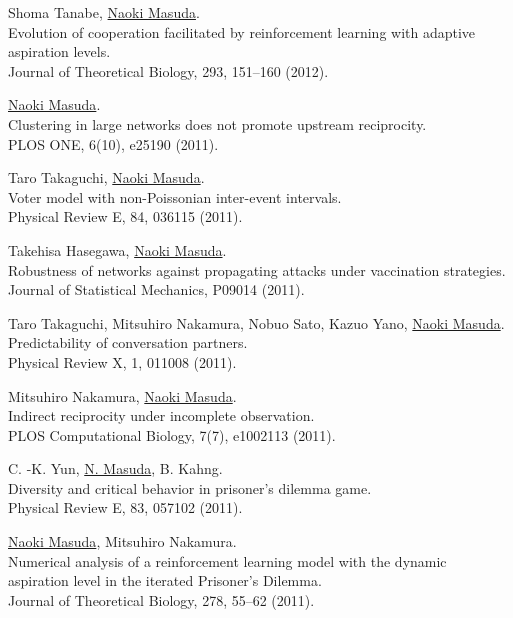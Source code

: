 \documentclass[11pt,letter]{article}
\begin{document}
\begin{etaremune}
\item Shoma Tanabe, \underline{Naoki Masuda}.\\
Evolution of cooperation facilitated by reinforcement learning with adaptive aspiration levels.\\
Journal of Theoretical Biology, 293, 151--160 (2012).

\item \underline{Naoki Masuda}.\\
Clustering in large networks does not promote upstream reciprocity.\\
PLOS ONE, 6(10), e25190 (2011).

\item Taro Takaguchi, \underline{Naoki Masuda}.\\
Voter model with non-Poissonian inter-event intervals.\\
Physical Review E, 84, 036115 (2011).

\item Takehisa Hasegawa, \underline{Naoki Masuda}.\\
Robustness of networks against propagating attacks under vaccination strategies.\\
Journal of Statistical Mechanics, P09014 (2011).

\item Taro Takaguchi, Mitsuhiro Nakamura, Nobuo Sato, Kazuo Yano, \underline{Naoki Masuda}.\\
Predictability of conversation partners.\\
Physical Review X, 1, 011008 (2011).

\item Mitsuhiro Nakamura, \underline{Naoki Masuda}.\\
Indirect reciprocity under incomplete observation.\\
PLOS Computational Biology, 7(7), e1002113 (2011).

\item C. -K. Yun, \underline{N. Masuda}, B. Kahng.\\
Diversity and critical behavior in prisoner's dilemma game.\\
Physical Review E, 83, 057102 (2011).

\item \underline{Naoki Masuda}, Mitsuhiro Nakamura.\\
Numerical analysis of a reinforcement learning model with the dynamic aspiration level in the iterated Prisoner's Dilemma.\\
Journal of Theoretical Biology, 278, 55--62 (2011).


\end{etaremune}
\end{document}
